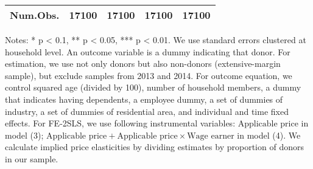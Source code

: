 \begin{table}
\begin{threeparttable}
\begin{tabular}[t]{l>{\centering\arraybackslash}p{7.5em}>{\centering\arraybackslash}p{7.5em}>{\centering\arraybackslash}p{7.5em}>{\centering\arraybackslash}p{7.5em}}
Num.Obs. & \num{17100} & \num{17100} & \num{17100} & \num{17100}\\
\bottomrule
\end{tabular}
\begin{tablenotes}
\item Notes: * p < 0.1, ** p < 0.05, *** p < 0.01. We use standard errors clustered at household level. An outcome variable is a dummy indicating that donor. For estimation, we use not only donors but also non-donors (extensive-margin sample), but exclude samples from 2013 and 2014. For outcome equation, we control squared age (divided by 100), number of household members, a dummy that indicates having dependents, a employee dummy, a set of dummies of industry, a set of dummies of residential area, and individual and time fixed effects. For FE-2SLS, we use following instrumental variables: $\text{Applicable price}$ in model (3); $\text{Applicable price} + \text{Applicable price} \times \text{Wage earner}$ in model (4). We calculate implied price elasticities by dividing estimates by proportion of donors in our sample.
\end{tablenotes}
\end{threeparttable}
\end{table}
